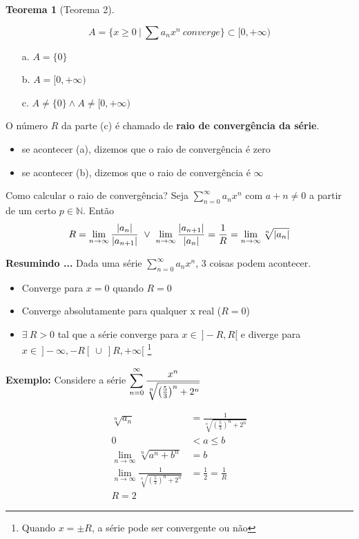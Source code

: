 \documentclass[12pt,openany, letterpaper]{book}
\newtheorem{theorem}{Teorema}[section]
\newcommand{\LI}[1][n]{\lim_{{#1} \rightarrow \infty}}
\newcommand{\soma}[2][n]{\sum_{{#1} = #2}^\infty}
\begin{document}
{{\begin{theorem}[Teorema 2]
\end{theorem}

$$A = \{x\geq 0 \ | \ \sum a_n x^n \ converge\} \subset [0, +\infty)$$
\begin{itemize}
\item [a.] $A = \{0\}$
\item [b.] $A = [0, +\infty)$
\item [c.] $A \neq \{0\} \land A \neq [0, +\infty)$
\end{itemize}

O número $R$ da parte (c) é chamado de \textbf{raio de convergência da série}. \begin{itemize}
\item se acontecer (a), dizemos que o raio de convergência é zero
\item se acontecer (b), dizemos que o raio de convergência é $\infty$
\end{itemize}

Como calcular o raio de convergência? Seja $\soma{0}a_n x^n$ com $a+n \neq 0$ a partir de um certo $p \in \mathds{N}$. Então $$ R = \LI \frac{|a_n|}{|a_{n+1}|} \  \lor \ \LI \frac{|a_{n+1}|}{|a_n|} = {1 \over R} = \LI \sqrt[n]{|a_n|} $$

\textbf{Resumindo ...} Dada uma série $\displaystyle{\soma{0} a_n x^n}$, 3 coisas podem acontecer. \begin{itemize}
\item Converge para $x = 0$ quando $R = 0$
\item Converge absolutamente para qualquer x real ($R = 0$)
\item $ \exists \ R > 0$ tal que a série converge para $x \in \ ]-R,R[$ e diverge para $ x \in \ ]-\infty,-R[\ \cup \ ]R,+\infty[$ \footnote{Quando $x = \pm R$, a série pode ser convergente ou não}
\end{itemize}

\textbf{Exemplo:} Considere a série $\displaystyle{\soma{0} {x^n \over \sqrt[n]{\left(\frac{5}{3}\right)^n + 2^n}}}$ \vspace{7mm}

\begin{align*}
\sqrt[n]{a_n} &= \frac{1}{\sqrt[n]{\left(\frac{5}{3}\right)^n + 2^n}} \\
0 &< a \leq b \\
\LI \sqrt[n]{a^n + b^n} &= b \\
\LI \frac{1}{\sqrt[n]{\left(\frac{5}{3}\right)^n + 2^n}} &= \frac{1}{2} = \frac{1}{R} \\
R = 2
\end{align*}

}}
\end{document}
